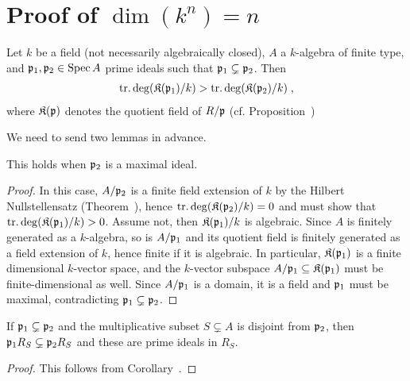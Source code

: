 \documentclass[a4paper,parskip=half,numbers=enddot, DIV=12]{scrreprt}
\begin{document}
\section{Proof of \texorpdfstring{$\dim(k^n) = n$}{dim(kn) = n}}
	\begin{prop}
		Let $k$ be a field (not necessarily algebraically closed), $A$ a $k$-algebra of finite type, and $\mathfrak{p}_1,\mathfrak{p}_2\in \operatorname{Spec} A$ prime ideals such that $\mathfrak{p}_1\subsetneq \mathfrak{p}_2$. Then 
		\begin{align*}
			\operatorname{tr.deg}(\mathfrak{K}(\mathfrak{p}_1)/k)> \operatorname{tr.deg}(\mathfrak{K}(\mathfrak{p}_2)/k)\;,
		\end{align*}
		where $\mathfrak{K}(\mathfrak{p})$ denotes the quotient field of $R/\mathfrak{p}$ (cf. Proposition~)
	\end{prop}
	We need to send two lemmas in advance.
	\begin{lem}
		This holds when $\mathfrak{p}_2$ is a maximal ideal.
	\end{lem}
	\begin{proof}
		In this case, $A/\mathfrak{p}_2$ is a finite field extension of $k$ by the Hilbert Nullstellensatz (Theorem~), hence $\operatorname{tr.deg}(\mathfrak{K}(\mathfrak{p}_2)/k) =0$ and must show that $\operatorname{tr.deg} (\mathfrak{K}(\mathfrak{p}_1)/k)>0$. Assume not, then $\mathfrak{K}(\mathfrak{p}_1)/k$ is algebraic. Since $A$ is finitely generated as a $k$-algebra, so is $A/\mathfrak{p}_1$ and its quotient field is finitely generated as a field extension of $k$, hence finite if it is algebraic. In particular, $\mathfrak{K}(\mathfrak{p}_1)$ is a finite dimensional $k$-vector space, and the $k$-vector subspace $A/\mathfrak{p}_1\subseteq \mathfrak{K}(\mathfrak{p}_1)$ must be finite-dimensional as well. Since $A/\mathfrak{p}_1$  is a domain, it is a field and $\mathfrak{p}_1$ must be maximal, contradicting $\mathfrak{p}_1\subsetneq \mathfrak{p}_2$.
	\end{proof}
	\begin{lem}
		If $\mathfrak{p}_1\subsetneq \mathfrak{p}_2$ and the multiplicative subset $S\subsetneq A$ is disjoint from $\mathfrak{p}_2$, then $\mathfrak{p}_1 R_S\subsetneq \mathfrak{p}_2  R_S$ and these are prime ideals in $R_S$.
	\end{lem}
	\begin{proof}
		This follows from Corollary~.
	\end{proof}
\end{document}
